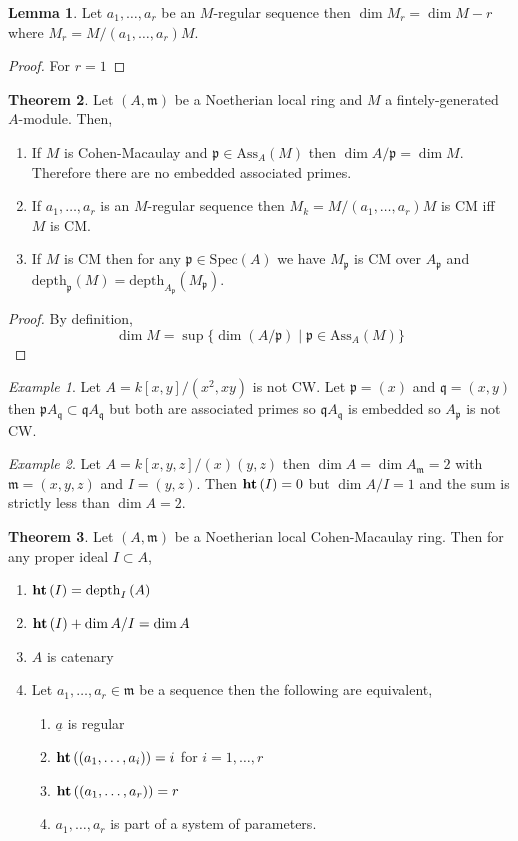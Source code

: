 \documentclass[12pt]{article}
\newcommand{\Ass}[2]{\mathrm{Ass}_{#1}\left( #2 \right)}
\newcommand{\Spec}[1]{\mathrm{Spec}\left( #1 \right)}
\newcommand{\depth}[2]{\mathrm{depth}_{#1}\left(#2\right)}
\newcommand{\p}{\mathfrak{p}}
\newcommand{\q}{\mathfrak{q}}
\newcommand{\m}{\mathfrak{m}}
\theoremstyle{remark}
\newtheorem*{example}{Example}
\theoremstyle{definition}
\newtheorem{theorem}{Theorem}[section]
\newtheorem{lemma}[theorem]{Lemma}
\begin{document}
\begin{lemma}
Let $a_1, \dots, a_r$ be an $M$-regular sequence then $\dim{M_r} = \dim{M} - r$ where $M_r = M/(a_1, \dots, a_r)M$. 
\end{lemma}

\begin{proof}
For $r = 1$ 
\end{proof}

\begin{theorem}
Let $(A, \m)$ be a Noetherian local ring and $M$ a fintely-generated $A$-module. Then,
\begin{enumerate}
\item If $M$ is Cohen-Macaulay and $\p \in \Ass{A}{M}$ then $\dim{A / \p} = \dim{M}$.
Therefore there are no embedded associated primes.
\item If $a_1, \dots, a_r$ is an $M$-regular sequence then $M_k = M / (a_1, \dots, a_r) M$ is CM iff $M$ is CM.
\item If $M$ is CM then for any $\p \in \Spec{A}$ we have $M_{\p}$ is CM over $A_\p$ and $\depth{\p}{M} = \depth{A_\p}{M_\p}$. 
\end{enumerate}
\end{theorem}

\begin{proof}
By definition, 
\[ \dim{M} = \sup\{ \dim(A / \p) \mid \p \in \Ass{A}{M} \} \] 
\end{proof}

\begin{example}
Let $A = k[x,y]/(x^2, xy)$ is not CW. Let $\p = (x)$ and $\q = (x,y)$ then $\p A_{\q} \subset \q A_{\q}$ but both are associated primes so $\q A_{\q}$ is embedded so $A_{\p}$ is not CW. 
\end{example}

\begin{example}
Let $A = k[x,y,z] / (x)(y,z)$ then $\dim{A} = \dim{A_{\m}} = 2$ with $\m = (x, y, z)$ and $I = (y, z)$. Then $\mathbf{ht}\left( I \right) = 0$ but $\dim{A / I} = 1$ and the sum is strictly less than $\dim{A} = 2$. 
\end{example}

\begin{theorem}
Let $(A, \m)$ be a Noetherian local Cohen-Macaulay ring. Then for any proper ideal $I \subset A$,
\begin{enumerate}
\item $\height{I} = \depth{I}{A}$
\item $\mathbf{ht}\left( I \right) + \dim{A / I} = \dim{A}$
\item $A$ is catenary
\item Let $a_1, \dots, a_r \in \m$ be a sequence then the following are equivalent,
\begin{enumerate}
\item $\underline{a}$ is regular
\item $\mathbf{ht}\left( (a_1, \dots, a_i) \right) = i$ for $i = 1, \dots, r$
\item $\mathbf{ht}\left( (a_1, \dots, a_r) \right) = r$
\item $a_1, \dots, a_r$ is part of a system of parameters. 
\end{enumerate}
\end{enumerate}
\end{theorem}
\end{document}
